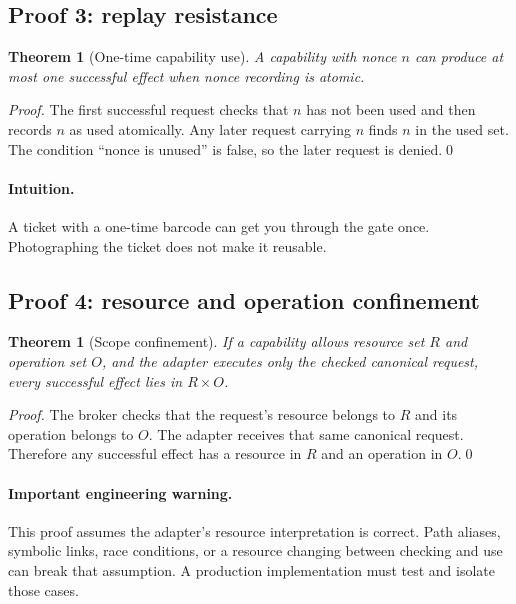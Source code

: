 \documentclass[11pt]{article}
\newtheorem{theorem}[definition]{Theorem}
\begin{document}
\subsection{Proof 3: replay resistance}
\begin{theorem}[One-time capability use]
A capability with nonce $n$ can produce at most one successful effect when nonce recording is atomic.
\end{theorem}
\begin{proof}
The first successful request checks that $n$ has not been used and then records $n$ as used atomically. Any later request carrying $n$ finds $n$ in the used set. The condition ``nonce is unused'' is false, so the later request is denied.\qed
\end{proof}

\paragraph{Intuition.} A ticket with a one-time barcode can get you through the gate once. Photographing the ticket does not make it reusable.

\subsection{Proof 4: resource and operation confinement}
\begin{theorem}[Scope confinement]
If a capability allows resource set $R$ and operation set $O$, and the adapter executes only the checked canonical request, every successful effect lies in $R\times O$.
\end{theorem}
\begin{proof}
The broker checks that the request's resource belongs to $R$ and its operation belongs to $O$. The adapter receives that same canonical request. Therefore any successful effect has a resource in $R$ and an operation in $O$.\qed
\end{proof}

\paragraph{Important engineering warning.} This proof assumes the adapter's resource interpretation is correct. Path aliases, symbolic links, race conditions, or a resource changing between checking and use can break that assumption. A production implementation must test and isolate those cases.
\end{document}
